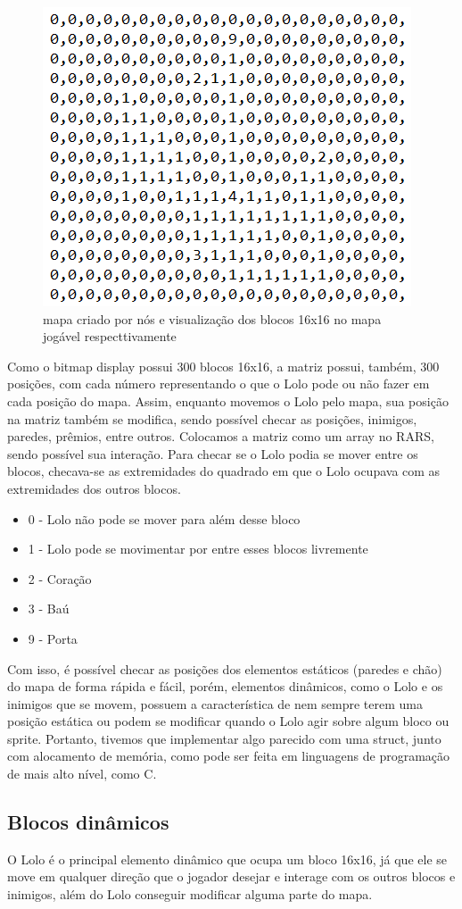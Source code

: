 \documentclass[10pt, conference, compsocconf]{IEEEtran}
\begin{document}
\begin{figure}[htb]
  \begin{center}
   \includegraphics[width=0.3\linewidth]{./Figures/image_7.png}
  \end{center}
  \caption{ mapa criado por nós e visualização dos
blocos 16x16 no mapa jogável respecttivamente}
  \label{fig:01}
\end{figure}

Como o bitmap display possui 300 blocos 16x16,
a matriz possui, também, 300 posições, com cada
número representando o que o Lolo pode ou não fazer
em cada posição do mapa. Assim, enquanto movemos
o Lolo pelo mapa, sua posição na matriz também se
modifica, sendo possível checar as posições, inimigos,
paredes, prêmios, entre outros. Colocamos a matriz
como um array no RARS, sendo possível sua interação. Para checar se o Lolo podia se mover entre os
blocos, checava-se as extremidades do quadrado em
que o Lolo ocupava com as extremidades dos outros
blocos.


\begin{itemize}
    \item 0 - Lolo não pode se mover para além desse bloco
    \item 1 - Lolo pode se movimentar por entre esses blocos livremente
    \item 2 - Coração
    \item 3 - Baú
    \item 9 - Porta
\end{itemize}

Com isso, é possível checar as posições dos elementos
estáticos (paredes e chão) do mapa de forma rápida e
fácil, porém, elementos dinâmicos, como o Lolo e os
inimigos que se movem, possuem a característica de
nem sempre terem uma posição estática ou podem
se modificar quando o Lolo agir sobre algum bloco
ou sprite. Portanto, tivemos que implementar algo
parecido com uma struct, junto com alocamento de
memória, como pode ser feita em linguagens de programação de mais alto nível, como C.

\subsection{Blocos dinâmicos}{
\label{sec:MIPS}
O Lolo é o principal elemento dinâmico que ocupa um
bloco 16x16, já que ele se move em qualquer direção
que o jogador desejar e interage com os outros blocos
e inimigos, além do Lolo conseguir modificar alguma
parte do mapa.

}
\end{document}
